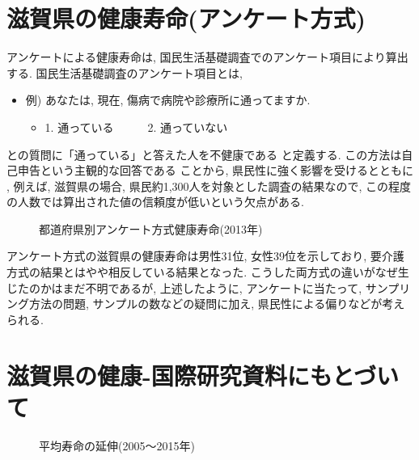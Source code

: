 \section{滋賀県の健康寿命(アンケート方式)}
アンケートによる健康寿命は,
国民生活基礎調査でのアンケート項目により算出する.
国民生活基礎調査のアンケート項目とは,

\begin{itemize} \setlength{\itemsep}{-0.5mm} \setlength{\parskip}{-0.5mm}
	\item  例) あなたは, 現在, 傷病で病院や診療所に通ってますか.
	      \begin{itemize} \setlength{\itemsep}{-0.5mm} \setlength{\parskip}{-0.5mm}
		      \item 1. 通っている~~~~~~2. 通っていない
	      \end{itemize}
\end{itemize}
との質問に「通っている」と答えた人を不健康である
と定義する.
この方法は自己申告という主観的な回答である
ことから, 県民性に強く影響を受けるとともに
, 例えば, 滋賀県の場合, 県民約1,300人を対象とした調査の結果なので, この程度の人数では算出された値の信頼度が低いという欠点がある.

\begin{figure}[h!]
	\begin{center}
		\caption{都道府県別アンケート方式健康寿命(2013年)}\label{fig1}
	\end{center}
\end{figure}

アンケート方式の滋賀県の健康寿命は男性31位, 女性39位を示しており, 要介護方式の結果とはやや相反している結果となった.
こうした両方式の違いがなぜ生じたのかはまだ不明であるが, 上述したように, アンケートに当たって, サンプリング方法の問題,
サンプルの数などの疑問に加え, 県民性による偏りなどが考えられる.
\section{滋賀県の健康-国際研究資料にもとづいて}
\begin{figure}[h!]
	\begin{center}
		\caption{平均寿命の延伸(2005〜2015年)}\label{fig10}
	\end{center}
\end{figure}

